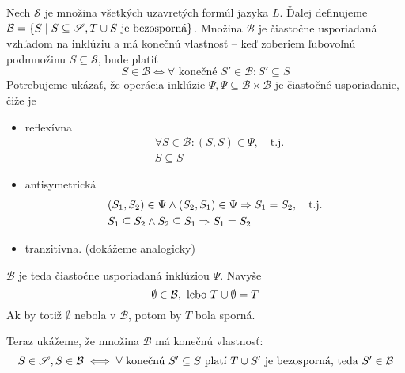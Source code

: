 \begin{dokaz}
    Nech $\mathscr{S}$ je množina všetkých uzavretých formúl jazyka $L$.
    Ďalej definujeme
    $\mathcal{B} = \{ S \mid S \subseteq \mathscr{S}, T \cup S
        \mbox{ je bezosporná}\}$.
    Množina $\mathcal{B}$ je čiastočne usporiadaná vzhľadom na
    inklúziu a má konečnú vlastnosť -- keď zoberiem ľubovoľnú podmnožinu
    $S \subseteq \mathscr{S}$, bude platiť
    \begin{equation*}
        S \in \mathcal{B} \iff \forall \mbox{ konečné } S' \in
        \mathcal{B}: S' \subseteq S
    \end{equation*}
     Potrebujeme ukázať, že operácia inklúzie $\Psi, \Psi \subseteq
     \mathcal{B}\times\mathcal{B}$ je čiastočné usporiadanie, čiže je
    \begin{itemize}
        \item reflexívna
            \begin{align*}
                &\forall S \in \mathcal{B}: (S,S) \in \Psi,
                \quad \mbox{t.j.} \\
                &S \subseteq S
            \end{align*}
        \item antisymetrická
            \begin{align*}
                &(S_1,S_2) \in \Psi \land (S_2,S_1) \in \Psi
                    \Rightarrow S_1 = S_2, \quad \mbox{t.j.} \\
                &S_1 \subseteq S_2 \land S_2 \subseteq S_1 \Rightarrow S_1 = S_2
            \end{align*}
        \item tranzitívna. (dokážeme analogicky)
    \end{itemize}
    $\mathcal{B}$ je teda čiastočne usporiadaná inklúziou $\Psi$.
    Navyše
    \begin{equation*}
        \emptyset \in \mathcal{B}, \mbox{ lebo } T \cup \emptyset = T
    \end{equation*}
    Ak by totiž $\emptyset$ nebola v $\mathcal{B}$, potom by $T$ bola sporná.

    Teraz ukážeme, že množina $\mathcal{B}$ má konečnú vlastnosť:
    \begin{equation*}
        S \in \mathscr{S}, S \in \mathcal{B} \iff \forall \textrm{
        konečnú }S' \subseteq S \textrm{ platí } T \cup S' 
            \textrm{ je bezosporná, teda }S' \in \mathcal{B}
    \end{equation*}
   

\end{dokaz}
